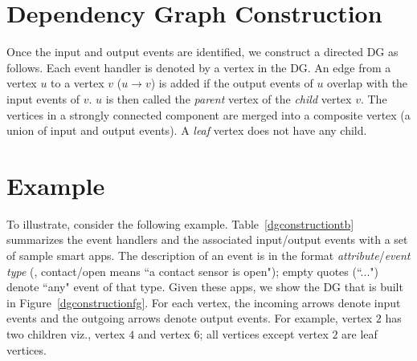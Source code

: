 {\section{Dependency Graph Construction}

Once the input and output events are identified,
we construct a directed DG as follows.
Each event handler is denoted by a vertex in the DG.
An edge from a vertex $u$ to a vertex $v$ ($u \rightarrow v$) is added
if the output events of $u$ overlap with the input events of $v$.
$u$ is then called the \textit{parent} vertex of the \textit{child} vertex $v$.
The vertices in a strongly connected component are merged into a composite vertex (a union of input and output events).
A \textit{leaf} vertex does not have any child.

\section{Example}
To illustrate, consider the following example.
Table~\ref{dgconstructiontb} summarizes the event handlers and the associated input/output
events with a set of sample smart apps.
The description of an event is in the format \textit{attribute}/\textit{event type}
(\eg, contact/open means ``a contact sensor is open");
empty quotes (``...") denote ``any" event of that type.
Given these apps, we show the DG that is built in Figure~\ref{dgconstructionfg}.
For each vertex, the incoming arrows denote input events and the outgoing arrows denote output events.
For example, vertex $2$ has two children viz., vertex $4$ and vertex $6$; all vertices except vertex $2$ are leaf vertices.

}
